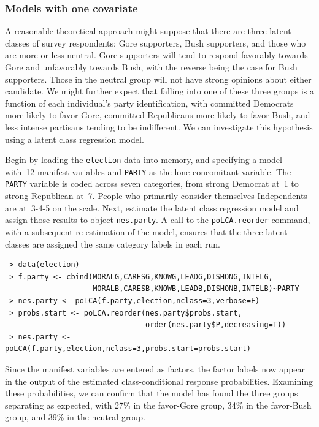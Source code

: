 \documentclass[letterpaper,12pt]{article}
\begin{document}
\subsubsection{Models with one covariate}

A reasonable theoretical approach might suppose that there are three latent classes of survey respondents: Gore supporters, Bush supporters, and those who are more or less neutral. Gore supporters will tend to respond favorably towards Gore and unfavorably towards Bush, with the reverse being the case for Bush supporters.  Those in the neutral group will not have strong opinions about either candidate. We might further expect that falling into one of these three groups is a function of each individual's party identification, with committed Democrats more likely to favor Gore, committed Republicans more likely to favor Bush, and less intense partisans tending to be indifferent. We can investigate this hypothesis using a latent class regression model.

Begin by loading the \texttt{election} data into memory, and specifying a model with~12 manifest variables and \texttt{PARTY} as the lone concomitant variable.  The \texttt{PARTY} variable is coded across seven categories, from strong Democrat at~1 to strong Republican at~7.  People who primarily consider themselves Independents are at~3-4-5 on the scale.  Next, estimate the latent class regression model and assign those results to object \texttt{nes.party}.  A call to the \texttt{poLCA.reorder} command, with a subsequent re-estimation of the model, ensures that the three latent classes are assigned the same category labels in each run.
\begin{verbatim}
 > data(election)
 > f.party <- cbind(MORALG,CARESG,KNOWG,LEADG,DISHONG,INTELG,
                    MORALB,CARESB,KNOWB,LEADB,DISHONB,INTELB)~PARTY
 > nes.party <- poLCA(f.party,election,nclass=3,verbose=F)
 > probs.start <- poLCA.reorder(nes.party$probs.start,
                                order(nes.party$P,decreasing=T))
 > nes.party <- poLCA(f.party,election,nclass=3,probs.start=probs.start)
\end{verbatim}
Since the manifest variables are entered as factors, the factor labels now appear in the output of the estimated class-conditional response probabilities.  Examining these probabilities, we can confirm that the model has found the three groups separating as expected, with 27\% in the favor-Gore group, 34\% in the favor-Bush group, and 39\% in the neutral group.
\end{document}
